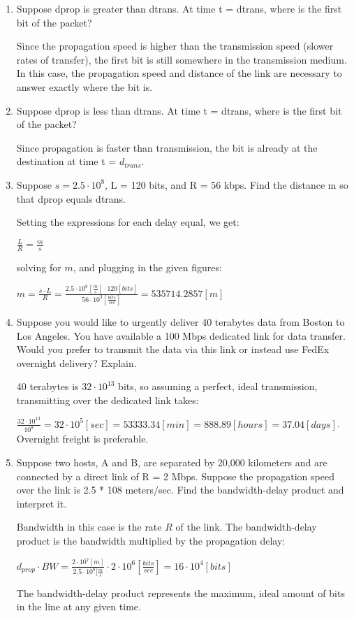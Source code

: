 \documentclass[10pt]{article}
\begin{document}
\begin{enumerate}
    \item Suppose dprop is greater than dtrans. At time t = dtrans, where is the first bit of the packet?
    
    Since the propagation speed is higher than the transmission speed (slower rates of transfer), the first bit is still somewhere in the transmission medium.  In this case, the propagation speed and distance of the link are necessary to answer exactly where the bit is.
    
    \item Suppose dprop is less than dtrans. At time t = dtrans, where is the first bit of the packet?
    
    Since propagation is faster than transmission, the bit is already at the destination at time t = $d_{trans}$.
    
    
    \item Suppose $s = 2.5\cdot10^8$, L = 120 bits, and R = 56 kbps. Find the distance m so that dprop equals dtrans.
    
    Setting the expressions for each delay equal, we get:
    
    $\frac{L}{R}=\frac{m}{s}$
    
    solving for $m$, and plugging in the given figures:
    
    $m = \frac{s\cdot L}{R} = \frac{2.5\cdot 10^8 [\frac{m}{s}] \cdot 120 [bits]}{56\cdot 10^3 [\frac{bits}{sec}]} = 535714.2857[m]$
    
    \item Suppose you would like to urgently deliver 40 terabytes data from Boston to Los Angeles. You have available a 100 Mbps dedicated link for data transfer. Would you prefer to transmit the data via this link or instead use FedEx overnight delivery? Explain.
    
    40 terabytes is $32\cdot 10^{13}$ bits, so assuming a perfect, ideal transmission, transmitting over the dedicated link takes:
    
    $\frac{32\cdot 10^{13}}{10^8} = 32\cdot 10^5[sec] = 53333.34[min] = 888.89[hours] = 37.04[days]$.  Overnight freight is preferable.
    
    \item Suppose two hosts, A and B, are separated by 20,000 kilometers and are connected by a direct link of R = 2 Mbps. Suppose the propagation speed over the link is 2.5 * 108 meters/sec.  Find the bandwidth-delay product and interpret it.
    
    Bandwidth in this case is the rate $R$ of the link.  The bandwidth-delay product is the bandwidth multiplied by the propagation delay:
    
    $d_{prop} \cdot BW = \frac{2\cdot 10^7 [m]}{2.5\cdot 10^8 [\frac{m}{s}} \cdot 2\cdot 10^6 [\frac{bits}{sec}] = 16\cdot 10^4[bits]$
    
    The bandwidth-delay product represents the maximum, ideal amount of bits in the line at any given time.
    
    

\end{enumerate}
\end{document}
